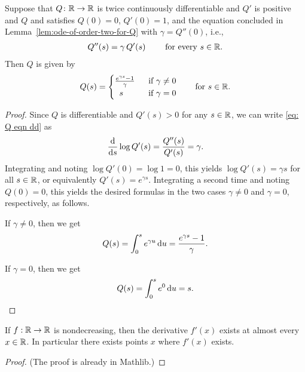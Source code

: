 \begin{lemma}
  \label{lem:solve-Q}
  Suppose that $Q \colon \mathbb{R} \to \mathbb{R}$ is twice continuously differentiable
  and $Q'$ is positive and $Q$
  and satisfies $Q(0)=0$, $Q'(0) = 1$, and the equation concluded in
  Lemma~\ref{lem:ode-of-order-two-for-Q} with $\gamma = Q''(0)$, i.e.,
  \begin{align}\label{eq: Q eqn dd}
  Q'' (s) = \gamma \, Q'(s) \qquad \text{ for every } s \in \mathbb{R} .
  \end{align}
  Then $Q$ is given by
  \begin{align*}
  Q(s) = \begin{cases}
    \frac{e^{\gamma s} - 1}{\gamma} & \; \text{ if $\gamma \ne 0$} \\
    \;\; s & \; \text{ if $\gamma = 0$}
    \end{cases}
    \qquad \text{for $s \in \mathbb{R}$.}
  \end{align*}
  \end{lemma}
\begin{proof}
  Since $Q$ is differentiable and $Q'(s)>0$ for any $s \in \mathbb{R}$,
  we can write \eqref{eq: Q eqn dd} as
  \begin{align*}
  \frac{\mathrm{d}}{\mathrm{d} s} \log Q'(s)
    = \frac{Q''(s)}{Q'(s)}
    = \gamma .
  \end{align*}
  Integrating and noting $\log Q'(0) = \log 1 = 0$, this
  yields $\log Q'(s) = \gamma s$ for all $s \in \mathbb{R}$, or equivalently
  $Q'(s) = e^{\gamma s}$. Integrating a second time
  and noting $Q(0) = 0$, this yields the desired formulas
  in the two cases $\gamma \ne 0$ and $\gamma = 0$, respectively, as follows.

  If $\gamma \ne 0$, then we get
  \begin{align*}
  Q(s) = \int_0^s e^{\gamma u} \, \mathrm{d} u = \frac{e^{\gamma s} - 1}{\gamma} .
  \end{align*}

  If $\gamma = 0$, then we get
  \begin{align*}
  Q(s) = \int_0^s e^0 \, \mathrm{d} u = s .
  \end{align*}
\end{proof}

\begin{theorem}
  \label{thm:monotone-ae-differentiable}
  \leanok
  \mathlibok
  If $f : \mathbb{R} \to \mathbb{R}$ is nondecreasing, then the derivative
  $f'(x)$ exists at almost every $x \in \mathbb{R}$.
  In particular there exists points $x$ where $f'(x)$ exists.
\end{theorem}
\begin{proof}
  \leanok
  \mathlibok
  (The proof is already in Mathlib.)
\end{proof}

